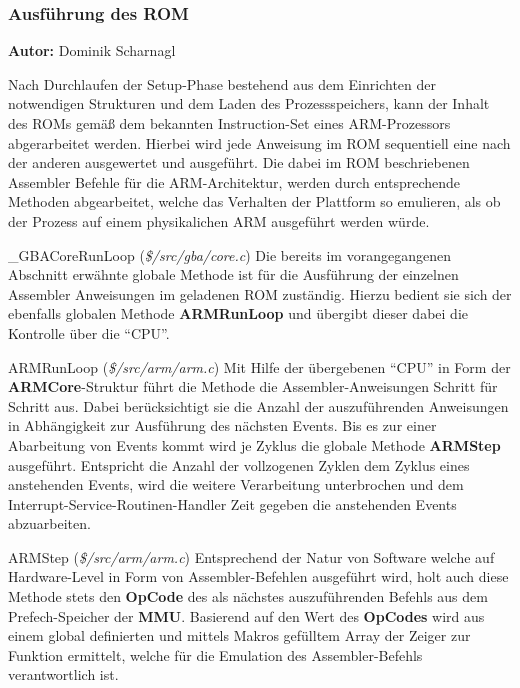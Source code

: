 \documentclass[11pt,a4paper]{scrartcl}
\newcommand{\AutorDominik} {
    \vspace{-4mm}
    \large \textbf{Autor:} Dominik Scharnagl \normalsize
    \vspace{2mm}
}
\begin{document}
\subsubsection{Ausf\"uhrung des ROM}
\AutorDominik

Nach Durchlaufen der Setup-Phase bestehend aus dem Einrichten der notwendigen Strukturen und dem Laden des Prozessspeichers, kann der Inhalt des ROMs gem\"a{\ss} dem bekannten Instruction-Set eines ARM-Prozessors abgerarbeitet werden. Hierbei wird jede Anweisung im ROM sequentiell eine nach der anderen ausgewertet und ausgef\"uhrt. Die dabei im ROM beschriebenen Assembler Befehle f\"ur die ARM-Architektur, werden durch entsprechende Methoden abgearbeitet, welche das Verhalten der Plattform so emulieren, als ob der Prozess auf einem physikalichen ARM ausgef\"uhrt werden w\"urde.

\vspace{5mm}
\large {\_}GBACoreRunLoop \normalsize(\textit{\$/src/gba/core.c})
\vspace{2mm}\newline
Die bereits im vorangegangenen Abschnitt erw\"ahnte globale Methode ist f\"ur die Ausf\"uhrung der einzelnen Assembler Anweisungen im geladenen ROM zust\"andig. Hierzu bedient sie sich der ebenfalls globalen Methode \textbf{ARMRunLoop} und \"ubergibt dieser dabei die Kontrolle \"uber die \enquote{CPU}.

\vspace{5mm}
\large ARMRunLoop \normalsize(\textit{\$/src/arm/arm.c})
\vspace{2mm}\newline
Mit Hilfe der \"ubergebenen \enquote{CPU} in Form der \textbf{ARMCore}-Struktur f\"uhrt die Methode die Assembler-Anweisungen Schritt f\"ur Schritt aus. Dabei ber\"ucksichtigt sie die Anzahl der auszuf\"uhrenden Anweisungen in Abh\"angigkeit zur Ausf\"uhrung des n\"achsten Events. Bis es zur einer Abarbeitung von Events kommt wird je Zyklus die globale Methode \textbf{ARMStep} ausgef\"uhrt. Entspricht die Anzahl der vollzogenen Zyklen dem Zyklus eines anstehenden Events, wird die weitere Verarbeitung unterbrochen und dem Interrupt-Service-Routinen-Handler Zeit gegeben die anstehenden Events abzuarbeiten.

\vspace{5mm}
\large ARMStep \normalsize(\textit{\$/src/arm/arm.c})
\vspace{2mm}\newline
Entsprechend der Natur von Software welche auf Hardware-Level in Form von Assembler-Befehlen ausgef\"uhrt wird, holt auch diese Methode stets den \textbf{OpCode} des als n\"achstes auszuf\"uhrenden Befehls aus dem Prefech-Speicher der \textbf{MMU}. Basierend auf den Wert des \textbf{OpCodes} wird aus einem global definierten und mittels Makros gef\"ulltem Array der Zeiger zur Funktion ermittelt, welche f\"ur die Emulation des Assembler-Befehls verantwortlich ist.
\end{document}
